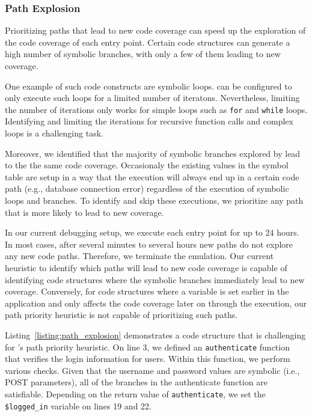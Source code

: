 \subsubsection{Path Explosion}
Prioritizing paths that lead to new code coverage can speed up the exploration of the code coverage of each entry point. 
Certain code structures can generate a high number of symbolic branches, with only a few of them leading to new coverage. 

One example of such code constructs are symbolic loops. 
\animatedead{} can be configured to only execute such loops for a limited number of iteratons. 
Nevertheless, limiting the number of iterations only works for simple loops such as \texttt{for} and \texttt{while} loops. 
Identifying and limiting the iterations for recursive function calls and complex loops is a challenging task. 

Moreover, we identified that the majority of symbolic branches explored by \animatedead{} lead to the the same code coverage. 
Occasionaly the existing values in the symbol table are setup in a way that the execution will always end up in a certain code path (e.g., database connection error) regardless of the execution of symbolic loops and branches. 
To identify and skip these executions, we prioritize any path that is more likely to lead to new coverage. 

In our current debugging setup, we execute each entry point for up to 24 hours. 
In most cases, after several minutes to several hours new paths do not explore any new code paths. 
Therefore, we terminate the emulation. 
Our current heuristic to identify which paths will lead to new code coverage is capable of identifying code structures where the symbolic branches immediately lead to new coverage. 
Conversely, for code structures where a variable is set earlier in the application and only affects the code coverage later on through the execution, our path priority heuristic is not capable of prioritizing such paths. 

Listing~\ref{listing:path_explosion} demonstrates a code structure that is challenging for \animatedead{}'s path priority heuristic. 
On line 3, we defined an \texttt{authenticate} function that verifies the login information for users. 
Within this function, we perform various checks. 
Given that the username and password values are symbolic (i.e., POST parameters), all of the branches in the authenticate function are satisfiable. 
Depending on the return value of \texttt{authenticate}, we set the \texttt{\$logged\_in} variable on lines 19 and 22. 

